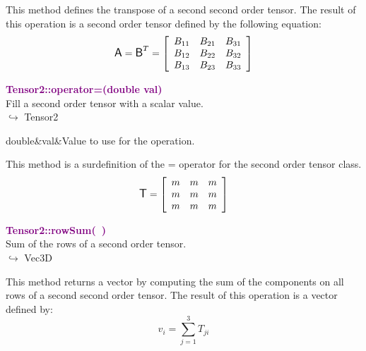 This method defines the transpose of a second second order tensor.
The result of this operation is a second order tensor defined by the following equation:
\begin{equation*}
\mbox{\large\ensuremath{\mathsf{A}}}=\mbox{\large\ensuremath{\mathsf{B}}}^T =\left[\begin{array}{ccc}
  B_{11} & B_{21} & B_{31}\\
  B_{12} & B_{22} & B_{32}\\
  B_{13} & B_{23} & B_{33}
  \end{array}\right]
\end{equation*}

\textcolor{purple}{\textbf{Tensor2::operator=(double val)}}\label{Tensor2::operator=(double val)}\\
Fill a second order tensor with a scalar value.\\ \hspace*{10mm}$\hookrightarrow$ Tensor2

\begin{tcolorbox}[width=\textwidth,myArgs,tabularx={ll|R}]
double&val&Value to use for the operation.
\end{tcolorbox}

This method is a surdefinition of the = operator for the second order tensor class.
\begin{equation*}
\mbox{\large\ensuremath{\mathsf{T}}}=\left[\begin{array}{ccc}
m&m&m\\
m&m&m\\
m&m&m
\end{array}\right]
\end{equation*}

\textcolor{purple}{\textbf{Tensor2::rowSum(~)}}\label{Tensor2::rowSum()}\\
Sum of the rows of a second order tensor.\\ \hspace*{10mm}$\hookrightarrow$ Vec3D

This method returns a vector by computing the sum of the components on all rows of a second second order tensor.
The result of this operation is a vector defined by:
\begin{equation*}
v_{i}=\sum_{j=1}^{3} T_{ji}
\end{equation*}

